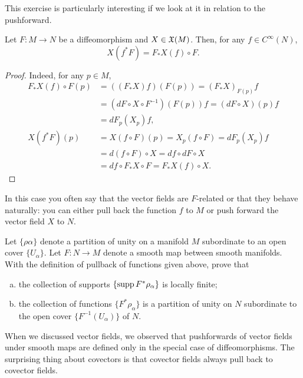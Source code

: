 This exercise is particularly interesting if we look at it in relation to the pushforward.
\begin{proposition}
  Let $F:M\to N$ be a diffeomorphism and $X\in\mathfrak{X}(M)$.
  Then, for any $f\in C^\infty(N)$,
  \begin{equation}
    X(f^* F) = F_*X(f) \circ F.
\end{equation}
\end{proposition}
\begin{proof}
  Indeed, for any $p\in M$,
\begin{align}
  F_*X(f) \circ F(p) &= ((F_*X) f) (F(p)) = (F_*X)_{F(p)} f \\
  &= (dF \circ X \circ F^{-1})(F(p)) f = (dF\circ X)(p) f \\
  &= dF_p(X_p) f, \\
  X (f^*F)(p) & = X(f\circ F)(p) = X_p(f\circ F) = dF_p(X_p) f \\
    &= d (f\circ F) \circ X = df \circ dF \circ X \\
    & = df \circ F_* X \circ F = F_* X (f) \circ X.
\end{align}
\end{proof}
In this case you often say that the vector fields are $F$-related or that they behave naturally: you can either pull back the function $f$ to $M$ or push forward the vector field $X$ to $N$.

\begin{exercise}
  Let $\{\rho\alpha\}$ denote a partition of unity on a manifold $M$ subordinate to an open cover $\{U_\alpha\}$.
  Let $F:N\to M$ denote a smooth map between smooth manifolds.
  With the definition of pullback of functions given above, prove that
  \begin{enumerate}[(a)]
    \item the collection of supports $\{\operatorname{supp} F^*\rho_\alpha\}$ is locally finite;
    \item the collection of functions $\{F^*\rho_\alpha\}$ is a partition of unity on $N$ subordinate to the open cover $\{F^{-1}(U_\alpha)\}$ of $N$.
  \end{enumerate}
\end{exercise}

When we discussed vector fields, we observed that pushforwards of vector fields under smooth maps are defined only in the special case of diffeomorphisms.
The surprising thing about covectors is that covector fields always pull back to covector fields.

